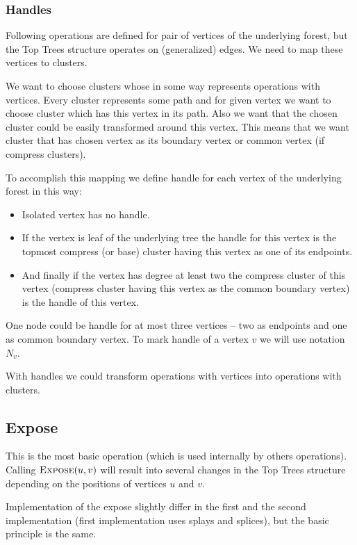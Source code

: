 \subsubsection{Handles}

Following operations are defined for pair of vertices of the underlying forest,
but the Top Trees structure operates on (generalized) edges. We need to map
these vertices to clusters.

We want to choose clusters whose in some way represents operations with
vertices. Every cluster represents some path and for given vertex we want to
choose cluster which has this vertex in its path. Also we want that the chosen
cluster could be easily transformed around this vertex. This means that we want
cluster that has chosen vertex as its boundary vertex or common vertex
(if compress clusters).

To accomplish this mapping we define {\I handle} for each vertex of the
underlying forest in this way:

\begin{itemize}
\item Isolated vertex has no handle.
\item If the vertex is leaf of the underlying tree the
handle for this vertex is the topmost compress (or base) cluster having this
vertex as one of its endpoints.
\item And finally if the vertex has degree at least two the compress cluster of
this vertex (compress cluster having this vertex as the common boundary vertex)
is the handle of this vertex.
\end{itemize}

One node could be handle for at most three vertices -- two as endpoints and one
as common boundary vertex. To mark handle of a vertex $v$ we will use notation
$N_v$.

With handles we could transform operations with vertices into operations with
clusters.

\subsection{Expose}

This is the most basic operation (which is used internally by others
operations). Calling $\hbox{\sc Expose}(u,v)$ will result into several changes in the Top
Trees structure depending on the positions of vertices $u$ and $v$.

Implementation of the expose slightly differ in the first and the second
implementation (first implementation uses splays and splices), but the basic
principle is the same.

